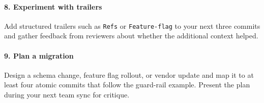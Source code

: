 \paragraph{8. Experiment with trailers} Add structured trailers such as \texttt{Refs} or \texttt{Feature-flag} to your next three commits and gather feedback from reviewers about whether the additional context helped.

\paragraph{9. Plan a migration} Design a schema change, feature flag rollout, or vendor update and map it to at least four atomic commits that follow the guard-rail example. Present the plan during your next team sync for critique.
